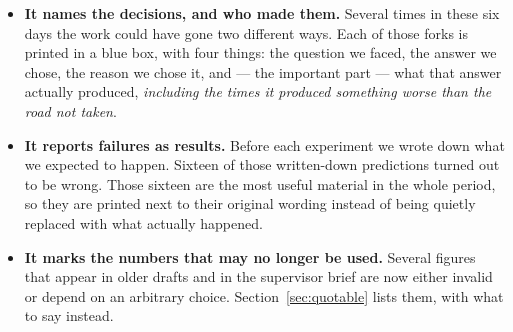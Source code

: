 \documentclass[11pt]{article}
\begin{document}
\begin{itemize}
  \item \textbf{It names the decisions, and who made them.} Several times in these six days the work
  could have gone two different ways. Each of those forks is printed in a blue box, with four things:
  the question we faced, the answer we chose, the reason we chose it, and --- the important part ---
  what that answer actually produced, \emph{including the times it produced something worse than the
  road not taken}.
  \item \textbf{It reports failures as results.} Before each experiment we wrote down what we expected
  to happen. Sixteen of those written-down predictions turned out to be wrong. Those sixteen are the most
  useful material in the whole period, so they are printed next to their original wording instead of
  being quietly replaced with what actually happened.
  \item \textbf{It marks the numbers that may no longer be used.} Several figures that appear in older
  drafts and in the supervisor brief are now either invalid or depend on an arbitrary choice.
  Section~\ref{sec:quotable} lists them, with what to say instead.
\end{itemize}
\end{document}
